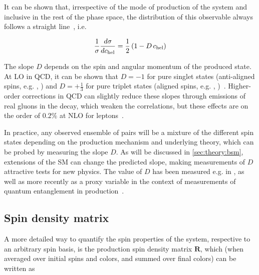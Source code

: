 It can be shown that, irrespective of the mode of production of the \ttbar system and inclusive in the rest of the phase space, the distribution of this observable always follows a straight line~\cite{Bernreuther:2004jv}, i.e.

\begin{equation}
\label{eq:theory:chel}
    \frac{1}{\sigma} \frac{d \sigma}{d c_{\mathrm{hel}}} = \frac{1}{2} \left( 1 - D \, c_{\mathrm{hel}} \right)
\end{equation}

The slope $D$ depends on the spin and angular momentum of the produced \ttbar state. At LO in QCD, it can be shown that $D=-1$ for pure singlet states (anti-aligned spins, e.g. , ) and $D=+\frac{1}{3}$ for pure triplet states (aligned spins, e.g. , )~\cite{Maltoni:2024tul,Cheng:2024btk}. Higher-order corrections in QCD can slightly reduce these slopes through emissions of real gluons in the decay, which weaken the correlations, but these effects are on the order of $0.2\%$ at NLO for leptons~\cite{Czarnecki:1990pe,Bernreuther:2003ga}. %

In practice, any observed ensemble of \ttbar pairs will be a mixture of the different spin states depending on the production mechanism and underlying theory, which can be probed by measuring the slope $D$. As will be discussed in \cref{sec:theory:bsm}, extensions of the SM can change the predicted slope, making measurements of $D$ attractive tests for new physics. The value of $D$ has been measured e.g. in , as well as more recently as a proxy variable in the context of measurements of quantum entanglement in \ttbar production~\cite{CMS:TOP-23-001,ATLAS:2023fsd}.


\subsection{Spin density matrix}
\label{sec:theory:spindensity}

A more detailed way to quantify the spin properties of the \ttbar system, respective to an arbitrary spin basis, is the production spin density matrix $\mathbf{R}$, which (when averaged over initial spins and colors, and summed over final colors) can be written as~\cite{Maltoni:2024tul,Cheng:2024btk,Anuar:PhD}

